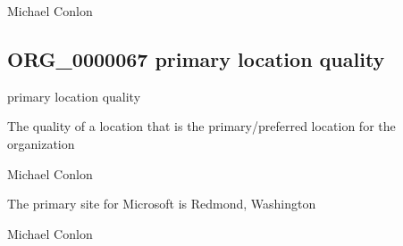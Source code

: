 \documentclass[letterpaper,10pt,english]{sphinxmanual}
\begin{document}
\begin{sphinxShadowBox}

\sphinxAtStartPar
Michael Conlon 
\end{sphinxShadowBox}
\begin{quote}

\ignorespaces \end{quote}


\subsection{ORG\_0000067 \sphinxhyphen{} primary location quality}
\label{\detokenize{doc-ORG_0000067:org-0000067-primary-location-quality}}\label{\detokenize{doc-ORG_0000067:index-0}}\label{\detokenize{doc-ORG_0000067::doc}}
\begin{sphinxShadowBox}

\sphinxAtStartPar
primary location quality
\end{sphinxShadowBox}

\begin{sphinxShadowBox}

\sphinxAtStartPar
The quality of a location that is the primary/preferred location for the organization
\end{sphinxShadowBox}

\begin{sphinxShadowBox}

\sphinxAtStartPar
Michael Conlon 
\end{sphinxShadowBox}

\begin{sphinxShadowBox}

\sphinxAtStartPar
The primary site for Microsoft is Redmond, Washington
\end{sphinxShadowBox}

\begin{sphinxShadowBox}

\sphinxAtStartPar
Michael Conlon 
\end{sphinxShadowBox}
\begin{quote}

\ignorespaces \end{quote}
\end{document}
